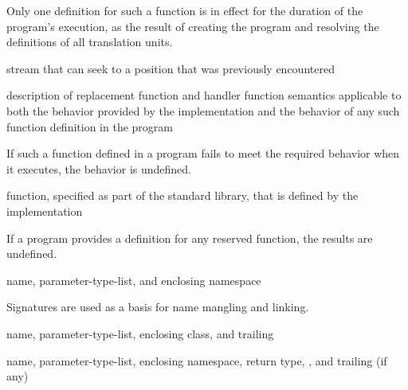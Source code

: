 \begin{defnote}
Only one definition for such a function is in effect for the duration of the program's
execution, as the result of creating the program and resolving the
definitions of all translation units.
\end{defnote}

%
stream that can seek to a position that was previously encountered

%
description of replacement function and handler function semantics
applicable to both the behavior provided by the implementation and
the behavior of any such function definition in the program

\begin{defnote}
If such a function defined in a \Cpp{} program fails to meet the required
behavior when it executes, the behavior is undefined.%
\end{defnote}

%
function, specified as part of the \Cpp{} standard library, that is defined by the
implementation

\begin{defnote}
If a \Cpp{} program provides a definition for any reserved function, the results are undefined.%
\end{defnote}

%
name,
parameter-type-list,
and enclosing namespace

\begin{defnote}
Signatures are used as a basis for
name mangling and linking.
\end{defnote}

%
name,
parameter-type-list,
enclosing class,
and
trailing 

%
name,
parameter-type-list,
enclosing namespace,
return type,
,
and
trailing  (if any)

